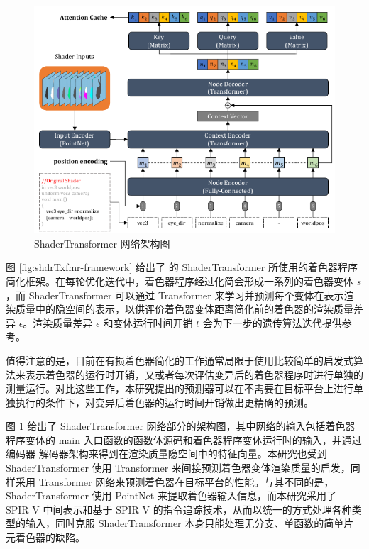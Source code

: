 \begin{figure}
    \centering
    \includegraphics{figures/ShaderTransformer-Flow.pdf}
    \caption{ShaderTransformer 网络架构图\cite{10.1145/3528233.3530722}}
    \label{fig:shdrTxfmr-arch}
\end{figure}

图 \ref{fig:shdrTxfmr-framework} 给出了 \citet{10.1145/3528233.3530722} 的 ShaderTransformer 所使用的着色器程序简化框架。在每轮优化迭代中，着色器程序经过化简会形成一系列的着色器变体 $ s $，而 ShaderTransformer 可以通过 Transformer 来学习并预测每个变体在表示渲染质量中的隐空间的表示，以供评价着色器变体距离简化前的着色器的渲染质量差异 $ \epsilon $。渲染质量差异 $ \epsilon $ 和变体运行时间开销 $ t $ 会为下一步的遗传算法迭代提供参考。

值得注意的是，目前在有损着色器简化的工作通常局限于使用比较简单的启发式算法来表示着色器的运行时开销\cite{10.1145/2816795.2818104, 10.1111/cgf.13482, 10.1145/3528233.3530722}，又或者每次评估变异后的着色器程序时进行单独的测量运行\cite{10.1145/2661229.2661276}。对比这些工作，本研究提出的预测器可以在不需要在目标平台上进行单独执行的条件下，对变异后着色器的运行时间开销做出更精确的预测。

图 \ref{fig:shdrTxfmr-arch} 给出了 ShaderTransformer 网络部分的架构图，其中网络的输入包括着色器程序变体的 main 入口函数的函数体源码和着色器程序变体运行时的输入，并通过编码器-解码器架构来得到在渲染质量隐空间中的特征向量。本研究也受到 ShaderTransformer 使用 Transformer 来间接预测着色器变体渲染质量的启发，同样采用 Transformer 网络来预测着色器在目标平台的性能。与其不同的是，ShaderTransformer 使用 PointNet\cite{8099499} 来提取着色器输入信息，而本研究采用了 SPIR-V 中间表示和基于 SPIR-V 的指令追踪技术，从而以统一的方式处理各种类型的输入，同时克服 ShaderTransformer 本身只能处理无分支、单函数的简单片元着色器的缺陷。

